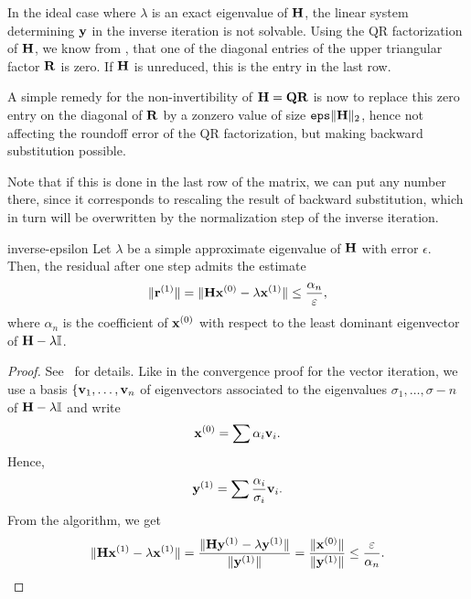 \begin{remark}
  In the ideal case where $\lambda$ is an exact eigenvalue of $\mathbf H$,
  the linear system determining $\mathbf y$ in the inverse iteration is not
  solvable. Using the QR factorization of $\mathbf H$, we know from
  , that one of the diagonal entries of
  the upper triangular factor $\mathbf R$ is zero. If $\mathbf H$ is
  unreduced, this is the entry in the last row.

  A simple remedy for the non-invertibility of $\mathbf H = \mathbf Q\mathbf R$ is
  now to replace this zero entry on the diagonal of $\mathbf R$ by a
  zonzero value of size $\texttt{eps} \lVert\mathbf H\rVert_2$, hence not affecting the
  roundoff error of the QR factorization, but making backward
  substitution possible.

  Note that if this is done in the last row of the matrix, we can put
  any number there, since it corresponds to rescaling the result of
  backward substitution, which in turn will be overwritten by the
  normalization step of the inverse iteration.
\end{remark}

\begin{Lemma}{inverse-epsilon}
  Let $\lambda$ be a simple approximate eigenvalue of $\mathbf H$ with
  error $\epsilon$. Then, the residual after one step admits the estimate
  \begin{gather}
    \lVert\mathbf r^{(1)}\rVert = \lVert\mathbf H\mathbf x^{(0)} - \lambda\mathbf x^{(1)}\rVert \le \frac{\alpha_n}{\varepsilon},
  \end{gather}
  where $\alpha_n$ is the coefficient of $\mathbf x^{(0)}$ with respect to the
least dominant eigenvector of $\mathbf H-\lambda\mathbb I$.
\end{Lemma}

\begin{proof}
  See~\cite{PetersWilkinson79} for details. Like in the convergence
  proof for the vector iteration, we use a basis $\{\mathbf v_1,\dots,\mathbf v_n$
  of eigenvectors associated to the eigenvalues
  $\sigma_1,\dots,\sigma-n$ of $\mathbf H-\lambda\mathbb I$ and write
  \begin{gather}
    \mathbf x^{(0)} = \sum \alpha_i\mathbf v_i.
  \end{gather}
  Hence,
  \begin{gather}
    \mathbf y^{(1)} = \sum \frac{\alpha_i}{\sigma_i} \mathbf v_i.
  \end{gather}
  From the algorithm, we get
  \begin{gather}
    \lVert\mathbf H\mathbf x^{(1)}-\lambda\mathbf x^{(1)}\rVert
    = \frac{\lVert\mathbf H\mathbf y^{(1)}-\lambda\mathbf y^{(1)}\rVert}{\lVert\mathbf y^{(1)}\rVert}
    = \frac{\lVert\mathbf x^{(0)}\rVert}{\lVert\mathbf y^{(1)}\rVert} \le \frac{\varepsilon}{\alpha_n}.
  \end{gather}
\end{proof}

